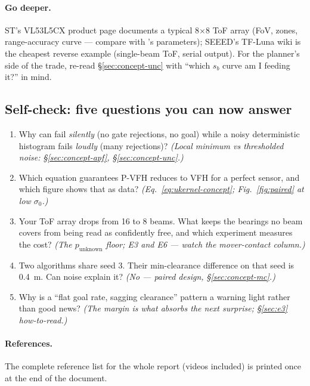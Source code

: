 \paragraph{Go deeper.} ST's VL53L5CX product page \cite{stvl53} documents a
typical 8$\times$8 ToF array (FoV, zones, range-accuracy curve --- compare
with 's parameters); SEEED's TF-Luna wiki \cite{tfluna}
is the cheapest reverse example (single-beam ToF, serial output). For the
planner's side of the trade, re-read \S\ref{sec:concept-unc} with ``which
$s_b$ curve am I feeding it?'' in mind.

\subsection{Self-check: five questions you can now answer}

\begin{enumerate}[leftmargin=1.9em]
\item Why can  fail \emph{silently} (no gate rejections, no goal)
while a noisy deterministic histogram fails \emph{loudly} (many rejections)? \emph{(Local minimum vs
thresholded noise: \S\ref{sec:concept-apf}, \S\ref{sec:concept-unc}.)}
\item Which equation guarantees P-VFH reduces to VFH for a perfect sensor,
and which figure shows that as data? \emph{(Eq.~\eqref{eq:ukernel-concept};
Fig.~\ref{fig:paired} at low $\sigma_0$.)}
\item Your ToF array drops from 16 to 8 beams. What keeps the bearings no
beam covers from being read as confidently free, and which experiment
measures the cost? \emph{(The $p_{\mathrm{unknown}}$ floor; E3 and E6 ---
watch the mover-contact column.)}
\item Two algorithms share seed 3. Their min-clearance difference on that
seed is 0.4~m. Can noise explain it? \emph{(No --- paired design,
\S\ref{sec:concept-mc}.)}
\item Why is a ``flat goal rate, sagging clearance'' pattern a warning light
rather than good news? \emph{(The margin is what absorbs the next surprise;
\S\ref{sec:e3} how-to-read.)}
\end{enumerate}

\paragraph{References.} The complete reference list for the whole report
(videos included) is printed once at the end of the document.
